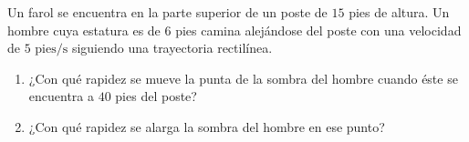 \item Un farol se encuentra en la parte superior de un poste de $15$ pies de altura. Un hombre cuya estatura es de $6$ pies camina alejándose del poste con una velocidad de $5 \text{ pies/s}$ siguiendo una trayectoria rectilínea.
\begin{enumerate}
    \item[(a)] ¿Con qué rapidez se mueve la punta de la sombra del hombre cuando éste se encuentra a $40$ pies del poste?
    \item[(b)] ¿Con qué rapidez se alarga la sombra del hombre en ese punto?
\end{enumerate}
